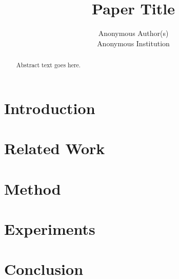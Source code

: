 \documentclass{article}
\title{Paper Title}
\author{%
  Anonymous Author(s) \\
  Anonymous Institution \\
}
\begin{document}
\maketitle

\begin{abstract}
Abstract text goes here.
\end{abstract}

\section{Introduction}

\section{Related Work}

\section{Method}

\section{Experiments}

\section{Conclusion}





\end{document}
